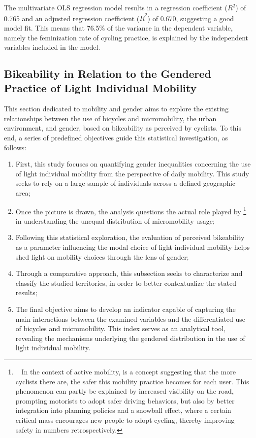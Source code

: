 \begin{refsegment}
The multivariate \acrshort{OLS} regression model results in a regression coefficient ($R^2$) of 0.765 and an adjusted regression coefficient ($\bar{R}^2$) of 0.670, suggesting a good model fit. This means that 76.5\% of the variance in the dependent variable, namely the feminization rate of cycling practice, is explained by the independent variables included in the model. %

\subsection{Bikeability in Relation to the Gendered Practice of Light Individual Mobility
    \label{section-chap4:cyclabilite-territoires-genre}
    }

This section dedicated to mobility and gender aims to explore the existing relationships between the use of bicycles and micromobility, the urban environment, and gender, based on bikeability as perceived by cyclists. To this end, a series of predefined objectives guide this statistical investigation, as follows:
\begin{enumerate}
    \item First, this study focuses on quantifying gender inequalities concerning the use of light individual mobility from the perspective of daily mobility. This study seeks to rely on a large sample of individuals across a defined geographic area;
    \item Once the picture is drawn, the analysis questions the actual role played by \footnote{~
In the context of active mobility,  is a concept suggesting that the more cyclists there are, the safer this mobility practice becomes for each user. This phenomenon can partly be explained by increased visibility on the road, prompting motorists to adopt safer driving behaviors, but also by better integration into planning policies and a snowball effect, where a certain critical mass encourages new people to adopt cycling, thereby improving safety in numbers retrospectively.
} in understanding the unequal distribution of micromobility usage;
    \item Following this statistical exploration, the evaluation of perceived bikeability as a parameter influencing the modal choice of light individual mobility helps shed light on mobility choices through the lens of gender;
    \item Through a comparative approach, this subsection seeks to characterize and classify the studied territories, in order to better contextualize the stated results;
    \item The final objective aims to develop an indicator capable of capturing the main interactions between the examined variables and the differentiated use of bicycles and micromobility. This index serves as an analytical tool, revealing the mechanisms underlying the gendered distribution in the use of light individual mobility.
\end{enumerate} %


\end{refsegment}
